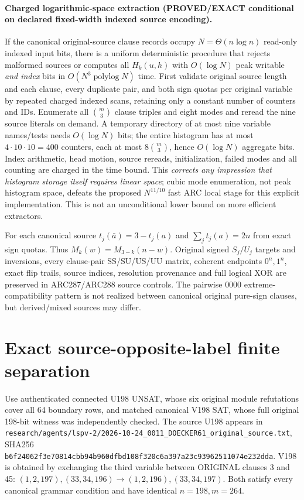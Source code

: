 \documentclass[10pt]{article}
\begin{document}
\paragraph{Charged logarithmic-space extraction (PROVED/EXACT conditional on declared fixed-width indexed source encoding).}
If the canonical original-source clause records occupy $N=\Theta(n\log n)$ read-only indexed input bits, there is a uniform deterministic procedure that rejects malformed sources or computes all $H_k(u,h)$ with $O(\log N)$ peak writable \emph{and index} bits in $O(N^3\operatorname{polylog}N)$ time. First validate original source length and each clause, every duplicate pair, and both sign quotas per original variable by repeated charged indexed scans, retaining only a constant number of counters and IDs. Enumerate all $\binom m3$ clause triples and eight modes and reread the nine source literals on demand. A temporary directory of at most nine variable names/tests needs $O(\log N)$ bits; the entire histogram has at most $4\cdot10\cdot10=400$ counters, each at most $8\binom m3$, hence $O(\log N)$ aggregate bits. Index arithmetic, head motion, source rereads, initialization, failed modes and all counting are charged in the time bound. This \emph{corrects any impression that histogram storage itself requires linear space}; cubic mode enumeration, not peak histogram space, defeats the proposed $N^{11/10}$ fast ARC local stage for this explicit implementation. This is not an unconditional lower bound on more efficient extractors.

For each canonical source $t_j(\bar a)=3-t_j(a)$ and $\sum_jt_j(a)=2n$ from exact sign quotas. Thus $M_k(w)=M_{3-k}(n-w)$. Original signed $S_j/U_j$ targets and inversions, every clause-pair SS/SU/US/UU matrix, coherent endpoints $0^n,1^n$, exact flip trails, source indices, resolution provenance and full logical XOR are preserved in ARC287/ARC288 source controls. The pairwise $0000$ extreme-compatibility pattern is not realized between canonical original pure-sign clauses, but derived/mixed sources may differ.

\section{Exact source-opposite-label finite separation}
Use authenticated connected U198 UNSAT, whose six original module refutations cover all 64 boundary rows, and matched canonical V198 SAT, whose full original 198-bit witness was independently checked. The source U198 appears in \texttt{research/agents/lspv-2/2026-10-24\_0011\_DOECKER61\_original\_source.txt}, SHA256 \texttt{b6f24062f3e70814cbb94b960dfbd108f320c6a397a23c93962511074e232dda}. V198 is obtained by exchanging the third variable between ORIGINAL clauses 3 and 45: $(1,2,197),(33,34,196)\to(1,2,196),(33,34,197)$. Both satisfy every canonical grammar condition and have identical $n=198,m=264$.
\end{document}
